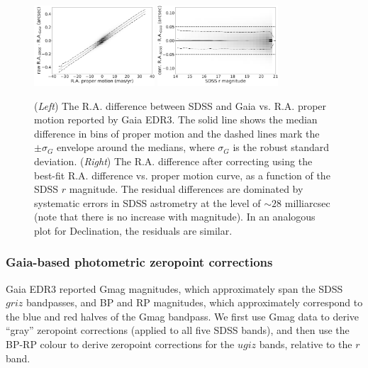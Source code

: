 \documentclass[fleqn,usenatbib]{mnras}
\begin{document}
\begin{figure}
\centering \includegraphics[width=0.4\textwidth, keepaspectratio]{figures/astroVSpm_RA_pm_lr.png}
\centering \includegraphics[width=0.4\textwidth, keepaspectratio]{figures/astroVSpm_RA_r_lr.png}

\caption{({\it Left}) The R.A. difference between SDSS and Gaia 
vs. R.A. proper motion reported by Gaia EDR3. The solid line shows the median difference in bins 
of proper motion and the dashed lines mark the $\pm \sigma_G$ envelope around the medians,
where $\sigma_G$ is the robust standard deviation. ({\it Right}) The R.A. difference 
after correcting using the best-fit R.A. difference vs. 
proper motion curve, as a function of the SDSS $r$ magnitude. The residual differences are dominated 
by systematic errors in SDSS astrometry at the level of $\sim28$ milliarcsec (note that there is no increase with 
magnitude). In an analogous plot for Declination, the residuals are similar. 
\label{fig:GaiaRApm}}
\end{figure}


\subsubsection{Gaia-based photometric zeropoint corrections  \label{sec:GaiaCorr2}}

Gaia EDR3 reported Gmag magnitudes, which approximately span the SDSS $griz$ bandpasses, 
and BP and RP magnitudes, which approximately correspond to the blue and red halves of the 
Gmag bandpass. We first use Gmag data to derive ``gray'' zeropoint corrections (applied to
all five SDSS bands), and then use the BP-RP colour to derive zeropoint corrections for the 
$ugiz$ bands, relative to the $r$ band. 
\end{document}
